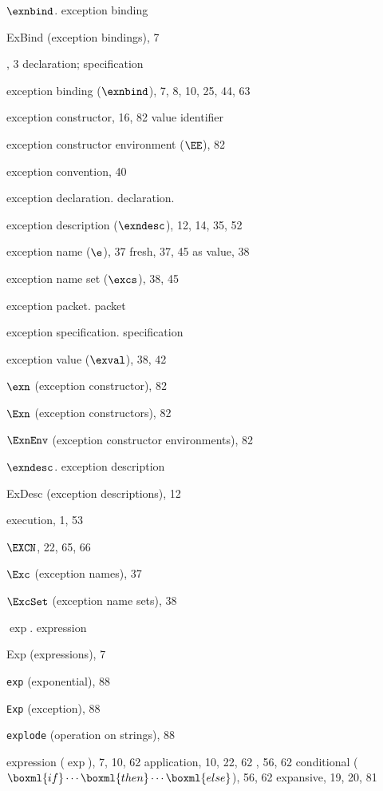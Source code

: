 \begin{theindex}
\item $\exnbind$. \see exception binding
\item ExBind (exception bindings), 7
\item \EXCEPTION, 3
\subitem \seealso declaration; specification
\item exception binding ($\exnbind$), 7, 8, 10, 25, 44, 63
\item exception constructor, 16, 82
\subitem \seealso value identifier
\item exception constructor environment ($\EE$), 82
\item exception convention, 40
\item exception declaration. \see declaration.
\item exception description ($\exndesc$), 12, 14, 35, 52
\item exception name ($\e$), 37
\subitem fresh, 37, 45
\subitem as value, 38
\item exception name set ($\excs$), 38, 45
\item exception packet. \see packet
\item exception specification. \see specification
\item exception value ($\exval$), 38, 42
\item $\exn$ (exception constructor), 82
\item $\Exn$ (exception constructors), 82
\item $\ExnEnv$ (exception constructor environments), 82
\item $\exndesc$. \see exception description
\item ExDesc (exception descriptions), 12
\item execution, 1, 53
\item $\EXCN$, 22, 65, 66
\item $\Exc$ (exception names), 37
\item $\ExcSet$ (exception name sets), 38
\item $\exp$. \see expression
\item Exp (expressions), 7
\item {\tt exp} (exponential), 88
\item {\tt Exp} (exception), 88
\item {\tt explode} (operation on strings), 88
\item expression ($\exp$), 7, 10, 62
\subitem application, 10, 22, 62
\subitem {}, 56, 62
\subitem conditional ($\boxml{if}\cdots\boxml{then}\cdots\boxml{else}$), 56, 62
\subitem expansive, 19, 20, 81

\end{theindex}
